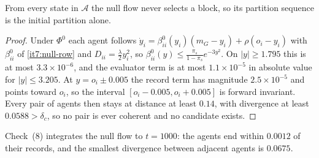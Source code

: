 \documentclass[11pt,letterpaper]{report}
\begin{document}
From every state in $\mathcal A$ the null flow never selects a block, so its partition sequence is the initial partition alone.
\begin{proof}
Under $\Phi^0$ each agent follows $\dot y_i=\beta^0_{ii}(y_i)(m_G-y_i)+\rho(o_i-y_i)$ with $\beta^0_{ii}$ of \cref{it7:null-row} and $D_{ii}=\frac\lambda2y_i^2$, so $\beta^0_{ii}(y)\le\frac{\pi_s}{1-\pi_s}e^{-3y^2}$. On $|y|\ge1.795$ this is at most $3.3\times10^{-6}$, and the evaluator term is at most $1.1\times10^{-5}$ in absolute value for $|y|\le3.205$. At $y=o_i\pm0.005$ the record term has magnitude $2.5\times10^{-5}$ and points toward $o_i$, so the interval $[o_i-0.005,o_i+0.005]$ is forward invariant. Every pair of agents then stays at distance at least $0.14$, with divergence at least $0.0588>\delta_c$, so no pair is ever coherent and no candidate exists.
\end{proof}

Check~(8) integrates the null flow to $t=1000$: the agents end within $0.0012$ of their records, and the smallest divergence between adjacent agents is $0.0675$.
\end{document}
